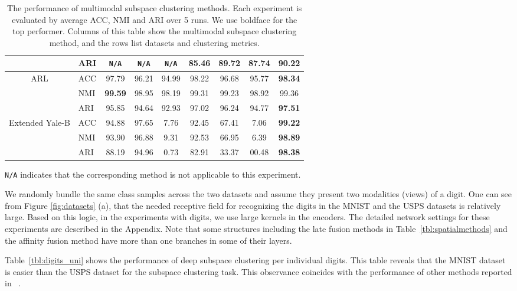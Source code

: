 \documentclass[journal]{IEEEtran}
\begin{document}
\begin{table*}[t!]
\begin{center}
{\begin{tabular}{|c|l|c|c|c|c|c|c|c|}
      \cline{2-9}
            &ARI	 &	\texttt{\scriptsize{N/A}} 	& 	\texttt{\scriptsize{N/A}}    &   \texttt{\scriptsize{N/A}} 	& 	85.46  &	89.72 	& 	87.74   &    \textbf{90.22}	 \\
\hline\hline
\multirow{3}{*}{ARL}
        &   ACC   &  97.79  &  96.21  &  94.99  &  98.22  &  96.68  &  95.77  &  \textbf{98.34}  \\
      \cline{2-9}
      &NMI	 &	\textbf{99.59} 	& 98.95	   &    98.19	& 	99.31  &	99.23 	& 	98.92   &    99.36	   \\\cline{2-9}
            &ARI	 &	95.85 	& 	  94.64	& 	92.93  &	  97.02 	& 	96.24 	& 	94.77   &    \textbf{97.51} \\
\hline\hline
\multirow{3}{*}{Extended Yale-B}
        &   ACC   &  94.88  &  97.65  &  7.76  &  92.45  &  67.41  &  7.06  &  \textbf{99.22}  \\ \cline{2-9}
      &NMI	 &	93.90 	& 	96.88    &   9.31	& 	92.53  &	66.95	& 	6.39   &    \textbf{98.89}	   \\
      \cline{2-9}
            &ARI	 &	88.19	& 	94.96   &    0.73	& 	82.91  &	33.37 	& 	00.48   &   \textbf{98.38}	 \\
\hline
\end{tabular}
}
\tiny{ \texttt{\scriptsize{N/A}} indicates that the corresponding method is not applicable to this experiment.}\hfill 
\caption{The performance of multimodal subspace clustering methods.		Each experiment is evaluated by average ACC,  NMI and ARI over 5 runs. We use boldface for the top performer. Columns of this table show the multimodal subspace clustering method, and the rows list datasets and clustering metrics. } \label{tbl:multi}
\end{center}
\end{table*}


We randomly bundle the same class samples across the two datasets and assume they present two modalities (views) of a digit.		One can see from Figure \ref{fig:datasets} (a), that the needed receptive field for recognizing the digits in the MNIST and the USPS datasets is relatively large.		  Based on this logic, in the experiments with digits, we use large kernels in the encoders.		The detailed network settings for these experiments are described in the Appendix.  Note that some structures including the late fusion methods in Table~\ref{tbl:spatialmethods} and the affinity fusion method  have more than one branches in some of their layers.  
		

Table~\ref{tbl:digits_uni} shows the performance of deep subspace clustering per individual digits.		  This table reveals that the MNIST dataset is easier than the USPS dataset for the subspace clustering task.		 This observance coincides with the performance of other methods reported in ~\cite{guo2017deep}.		
\end{document}
